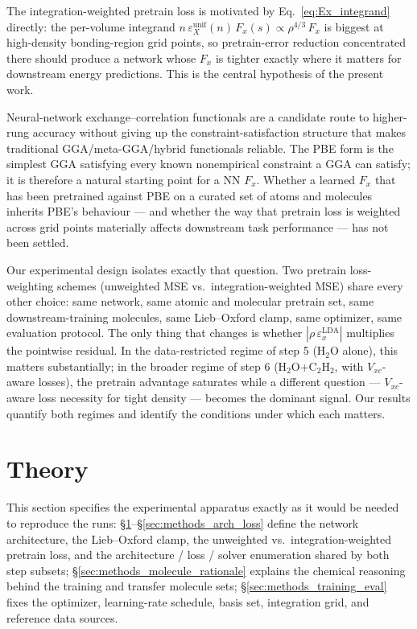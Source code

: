 \documentclass[11pt,letterpaper]{article}
\begin{document}
The integration-weighted pretrain loss is motivated by Eq.~\ref{eq:Ex_integrand}
directly: the per-volume integrand $n\,\varepsilon_X^{\text{unif}}(n)\, F_x(s) \propto
\rho^{4/3}\, F_x$ is biggest at high-density bonding-region grid points, so
pretrain-error reduction concentrated there should produce a network whose
$F_x$ is tighter exactly where it matters for downstream energy predictions.
This is the central hypothesis of the present work.

Neural-network exchange--correlation functionals are a
candidate route to higher-rung accuracy without giving up the
constraint-satisfaction structure that makes traditional
GGA/meta-GGA/hybrid functionals reliable. The PBE form
\citep{PerdewBurkeErnzerhof1996} is the simplest GGA satisfying every
known nonempirical constraint a GGA can satisfy; it is therefore a
natural starting point for a NN $F_x$. Whether a learned $F_x$ that has
been pretrained against PBE on a curated set of atoms and molecules
inherits PBE's behaviour --- and whether the way that pretrain loss is
weighted across grid points materially affects downstream task
performance --- has not been settled.

Our experimental design isolates exactly that question. Two pretrain
loss-weighting schemes (unweighted MSE vs.\ integration-weighted MSE)
share every other choice: same network, same atomic and molecular
pretrain set, same downstream-training molecules, same Lieb--Oxford
clamp, same optimizer, same evaluation protocol. The only thing that
changes is whether $|\rho\,\varepsilon_x^{\mathrm{LDA}}|$ multiplies the
pointwise residual. In the data-restricted regime of step 5
(H$_2$O alone), this matters substantially; in the broader regime of
step 6 (H$_2$O+C$_2$H$_2$, with $V_{xc}$-aware losses), the pretrain
advantage saturates while a different question --- $V_{xc}$-aware loss
necessity for tight density --- becomes the dominant signal. Our results
quantify both regimes and identify the conditions under which each
matters.

\section{Theory}
\label{sec:methods}

This section specifies the experimental apparatus exactly as it would be
needed to reproduce the runs: \S\ref{sec:methods}--\S\ref{sec:methods_arch_loss}
define the network architecture, the Lieb--Oxford clamp, the unweighted vs.\
integration-weighted pretrain loss, and the architecture / loss / solver
enumeration shared by both step subsets;
\S\ref{sec:methods_molecule_rationale} explains the chemical reasoning
behind the training and transfer molecule sets;
\S\ref{sec:methods_training_eval} fixes the optimizer, learning-rate
schedule, basis set, integration grid, and reference data sources.
\end{document}
